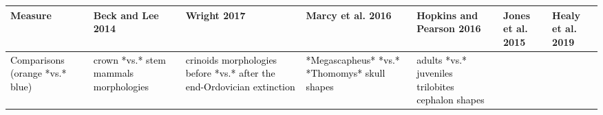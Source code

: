 \documentclass[]{article}
\begin{document}
\renewcommand\baselinestretch{1}\selectfont

\begin{longtable}[]{@{}lllllll@{}}
\toprule
\begin{minipage}[b]{0.09\columnwidth}\raggedright\strut
Measure\strut
\end{minipage} & \begin{minipage}[b]{0.11\columnwidth}\raggedright\strut
Beck and Lee 2014\strut
\end{minipage} & \begin{minipage}[b]{0.12\columnwidth}\raggedright\strut
Wright 2017\strut
\end{minipage} & \begin{minipage}[b]{0.13\columnwidth}\raggedright\strut
Marcy et al. 2016\strut
\end{minipage} & \begin{minipage}[b]{0.11\columnwidth}\raggedright\strut
Hopkins and Pearson 2016\strut
\end{minipage} & \begin{minipage}[b]{0.13\columnwidth}\raggedright\strut
Jones et al. 2015\strut
\end{minipage} & \begin{minipage}[b]{0.11\columnwidth}\raggedright\strut
Healy et al. 2019\strut
\end{minipage}\tabularnewline
\midrule
\endhead
\begin{minipage}[t]{0.09\columnwidth}\raggedright\strut
\textcolor{black}{Comparisons (orange *vs.* blue)}\strut
\end{minipage} & \begin{minipage}[t]{0.11\columnwidth}\raggedright\strut
\textcolor{black}{crown *vs.* stem mammals morphologies}\strut
\end{minipage} & \begin{minipage}[t]{0.12\columnwidth}\raggedright\strut
\textcolor{black}{crinoids morphologies before *vs.* after the end-Ordovician extinction}\strut
\end{minipage} & \begin{minipage}[t]{0.13\columnwidth}\raggedright\strut
\textcolor{black}{*Megascapheus* *vs.* *Thomomys* skull shapes}\strut
\end{minipage} & \begin{minipage}[t]{0.11\columnwidth}\raggedright\strut
\textcolor{black}{adults *vs.* juveniles trilobites cephalon shapes}\strut
\end{minipage} & \begin{minipage}[t]{0.13\columnwidth}\raggedright\strut

\end{minipage}
\end{longtable}
\end{document}
